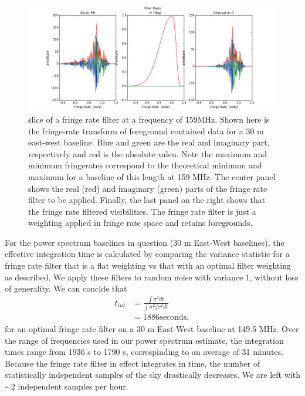 \documentclass[twocolumn,numberedappendix]{emulateapj} \shorttitle{PSA64}
\begin{document}
\begin{figure}[t!]\centering
\includegraphics[width=2\columnwidth]{plots/fr_preserved_signal.png}
\caption{slice of a fringe rate filter at a frequency of 159MHz. Shown here is
the fringe-rate transform of foreground contained data for a 30 m east-west
baseline. Blue and green are the real and imaginary part, respectively and red
is the absolute valeu. Note the maximum and minimum fringerates correspond to
the theoretical minimum and maximum for a baseline of this length at 159 MHz.
The center panel shows the real (red)  and imaginary (green) parts of the fringe
rate filter to be applied. Finally, the last panel on the right shows that the
fringe rate filtered visibilities. The fringe rate filter is just a weighting
applied in fringe rate space and retains foregrounds.}
\label{fig:fr_preserved_signal}
\end{figure}

For the power spectrum baselines in question (30 m East-West baselines), the
effective integration time is calculated by comparing the variance statistic for
a fringe rate filter that is a flat weighting vs that with an optimal filter
weighting as described. We apply these filters to random noise with variance 1,
without loss of generality. We can conclde that 
\begin{align}
    t_{int} &= \frac{\int{\sigma^{2}dt}}{\int{\sigma^{2}fr^{2}dt}}\\
            &= 1886 \text{seconds},
\end{align}
for an optimal fringe rate filter on a 30 m East-West baseline at 149.5 MHz.
Over the range of frequencies used in our power spectrum estimate, the
integration times range from 1936 s to 1790 s, correspinding to an average of 31
minutes. Because the fringe rate filter in effect integrates in time, the number
of statistically independent samples of the sky drastically decreases. We are
left with $\sim2$ independent samples per hour.
\end{document}
